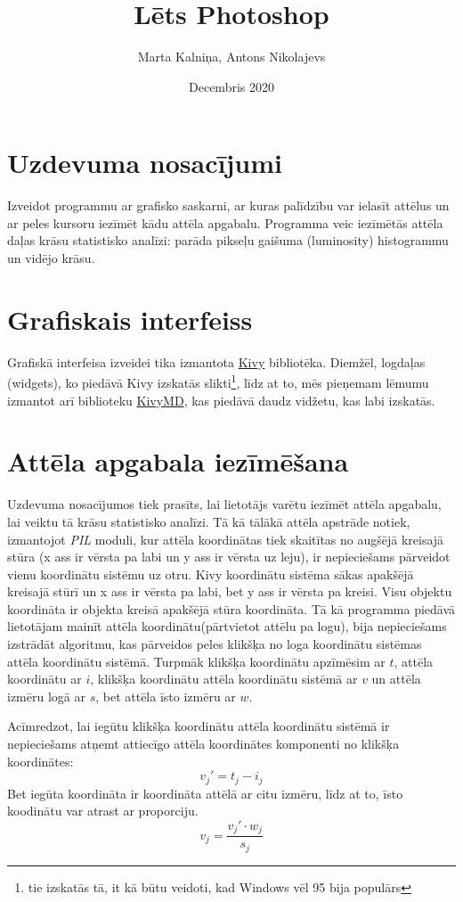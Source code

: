 \documentclass{article}
\title{Lēts Photoshop}
\author{Marta Kalniņa, Antons Nikolajevs }
\date{Decembris 2020}
\begin{document}
\maketitle

\section{Uzdevuma nosacījumi}
Izveidot programmu ar grafisko saskarni, ar kuras palīdzību var ielasīt attēlus un ar peles kursoru iezīmēt kādu attēla apgabalu. Programma veic iezīmētās attēla daļas krāsu statistisko analīzi: parāda pikseļu gaišuma (luminosity) histogrammu un vidējo krāsu.
\section{Grafiskais interfeiss}
Grafiskā interfeisa izveidei tika izmantota \href{https://kivy.org/#home}{Kivy} bibliotēka. Diemžēl, logdaļas (widgets), ko piedāvā Kivy izskatās slikti\footnote{tie izskatās tā, it kā būtu veidoti, kad Windows vēl 95 bija populārs}, līdz at to, mēs pieņemam lēmumu izmantot arī biblioteku \href{https://github.com/kivymd/KivyMD}{KivyMD}, kas piedāvā daudz vidžetu, kas labi izskatās.

\section{Attēla apgabala iezīmēšana}
Uzdevuma nosacījumos tiek prasīts, lai lietotājs varētu iezīmēt attēla apgabalu, lai veiktu tā krāsu statistisko analīzi.
Tā kā tālākā attēla apstrāde notiek, izmantojot \textit{PIL} moduli, kur attēla koordinātas tiek skaitītas no augšējā kreisajā stūra (x ass ir vērsta pa labi un y ass ir vērsta uz leju), ir nepieciešams pārveidot vienu koordinātu sistēmu uz otru. Kivy koordinātu sistēma sākas apakšējā kreisajā stūrī un x ass ir vērsta pa labi, bet y ass ir vērsta pa kreisi. Visu objektu koordināta ir objekta kreisā apakšējā stūra koordināta. Tā kā programma piedāvā lietotājam mainīt attēla koordinātu(pārtvietot attēlu pa logu), bija nepieciešams izstrādāt algoritmu, kas pārveidos peles klikšķa no loga koordinātu sistēmas attēla koordinātu sistēmā. Turpmāk klikšķa koordinātu apzīmēsim ar $t$, attēla koordinātu ar $i$, klikšķa koordinātu attēla koordinātu sistēmā ar $v$ un attēla izmēru logā ar $s$, bet attēla īsto izmēru ar $w$.

Acīmredzot, lai iegūtu klikšķa koordinātu attēla koordinātu sistēmā ir nepieciešams atņemt attiecīgo attēla koordinātes komponenti no klikšķa koordinātes:
$$
    v_j\prime = t_j - i_j
$$
Bet iegūta koordināta ir koordināta attēlā ar citu izmēru, līdz at to, īsto koodinātu var atrast ar proporciju.
$$
    v_j = \frac{v_j\prime \cdot w_j}{s_j}
$$
\end{document}
